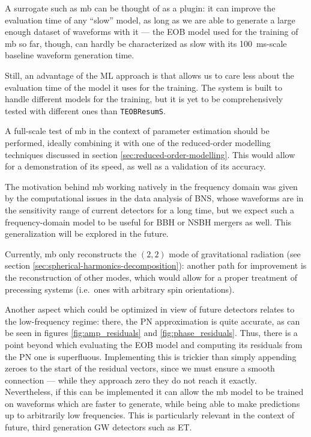 \documentclass[main.tex]{subfiles}
\begin{document}
A surrogate such as \ac{mb} can be thought of as a plugin: it can improve the evaluation time of any ``slow'' model, as long as we are able to generate a large enough dataset of waveforms with it --- 
the \ac{EOB} model used for the training of \ac{mb} so far, though, can hardly be characterized as slow with its \SI{100}{ms}-scale baseline waveform generation time.

Still, an advantage of the \ac{ML} approach is that allows us to care less about the evaluation time of the model it uses for the training. 
The system is built to handle different models for the training, but it is yet to be comprehensively tested with different ones than \texttt{TEOBResumS}.

A full-scale test of \ac{mb} in the context of parameter estimation should be performed, ideally combining it with one of the reduced-order modelling techniques discussed in section \ref{sec:reduced-order-modelling}.
This would allow for a demonstration of its speed, as well as a validation of its accuracy.

The motivation behind \ac{mb} working natively in the frequency domain was given by the computational issues in the data analysis of \ac{BNS}, whose waveforms are in the sensitivity range of current detectors for a long time, but we expect such a frequency-domain model to be useful for \ac{BBH} or \ac{NSBH} mergers as well.
This generalization will be explored in the future.

Currently, \ac{mb} only reconstructs the \((2, 2)\) mode of gravitational radiation (see section \ref{sec:spherical-harmonics-decomposition}): another path for improvement is the reconstruction of other modes, which would allow for a proper treatment of precessing systems (i.e.\ ones with arbitrary spin orientations). 

Another aspect which could be optimized in view of future detectors relates to the low-frequency regime: there, the \ac{PN} approximation is quite accurate, as can be seen in figures \ref{fig:amp_residuals} and \ref{fig:phase_residuals}. 
Thus, there is a point beyond which evaluating the \ac{EOB} model and computing its residuals from the \ac{PN} one is superfluous. 
Implementing this is trickier than simply appending zeroes to the start of the residual vectors, since we must ensure a smooth connection --- while they approach zero they do not reach it exactly. 
Nevertheless, if this can be implemented it can allow the \ac{mb} model to be trained on waveforms which are faster to generate, while being able to make predictions up to arbitrarily low frequencies.
This is particularly relevant in the context of future, third generation \ac{GW} detectors such as \ac{ET}.

\end{document}
